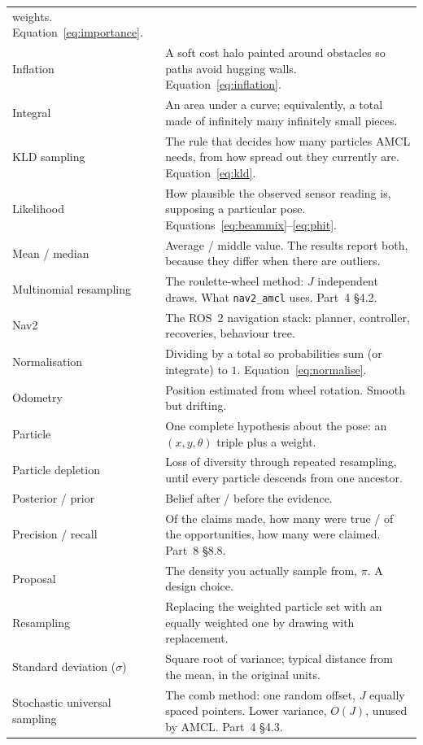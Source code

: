 \documentclass[11pt,a4paper]{report}
\newcommand{\file}[1]{\texttt{\small #1}}
\begin{document}
\begin{longtable}{@{}p{}p{}@{}}
  weights. Equation~\eqref{eq:importance}. \\
Inflation & A soft cost halo painted around obstacles so paths avoid hugging
  walls. Equation~\eqref{eq:inflation}. \\
Integral & An area under a curve; equivalently, a total made of infinitely many
  infinitely small pieces. \\
KLD sampling & The rule that decides how many particles AMCL needs, from how
  spread out they currently are. Equation~\eqref{eq:kld}. \\
Likelihood & How plausible the observed sensor reading is, supposing a
  particular pose. Equations~\eqref{eq:beammix}--\eqref{eq:phit}. \\
Mean / median & Average / middle value. The results report both, because they
  differ when there are outliers. \\
Multinomial resampling & The roulette-wheel method: $J$ independent draws.
  What \file{nav2\_amcl} uses. Part~4 \S4.2. \\
Nav2 & The ROS~2 navigation stack: planner, controller, recoveries, behaviour
  tree. \\
Normalisation & Dividing by a total so probabilities sum (or integrate) to $1$.
  Equation~\eqref{eq:normalise}. \\
Odometry & Position estimated from wheel rotation. Smooth but drifting. \\
Particle & One complete hypothesis about the pose: an $(x, y, \theta)$ triple
  plus a weight. \\
Particle depletion & Loss of diversity through repeated resampling, until every
  particle descends from one ancestor. \\
Posterior / prior & Belief after / before the evidence. \\
Precision / recall & Of the claims made, how many were true / of the
  opportunities, how many were claimed. Part~8 \S8.8. \\
Proposal & The density you actually sample from, $\pi$. A design choice. \\
Resampling & Replacing the weighted particle set with an equally weighted one
  by drawing with replacement. \\
Standard deviation ($\sigma$) & Square root of variance; typical distance from
  the mean, in the original units. \\
Stochastic universal sampling & The comb method: one random offset, $J$ equally
  spaced pointers. Lower variance, $O(J)$, unused by AMCL. Part~4 \S4.3. \\

\end{longtable}
\end{document}

